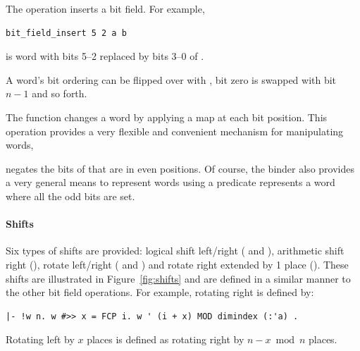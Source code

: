 {The  operation inserts a bit field.  For example,
\begin{hol}
\begin{verbatim}
bit_field_insert 5 2 a b
\end{verbatim}
\end{hol}
is word  with bits 5--2 replaced by bits 3--0 of .

A word's bit ordering can be flipped over with , \ie{} bit zero is swapped with bit $n - 1$ and so forth.

The function
 changes
a word by applying a map at each bit position.
This operation provides a very flexible and convenient mechanism for
manipulating words, \eg{}
\begin{hol}
\end{hol}
negates the bits of  that are in even positions.  Of course, the
binder  also provides a very general means to represent words using
a predicate \eg{}  represents a word where all the odd bits
are set.

\paragraph{Shifts}

Six types of shifts are provided: logical shift left/right (\holtxt{<<} and
\holtxt{>>>}), arithmetic shift right (\holtxt{>>}), rotate left/right
(\holtxt{\#<<} and \holtxt{\#>>}) and rotate right extended by 1 place
().  These shifts are illustrated in Figure~\ref{fig:shifts} and are defined in a similar manner to the other bit field operations.  For
example, rotating right is defined by:
\begin{hol}
\begin{verbatim}
|- !w n. w #>> x = FCP i. w ' (i + x) MOD dimindex (:'a) .
\end{verbatim}
\end{hol}
Rotating left by $x$ places is defined as rotating right by $n - x \bmod n$
places.

}
